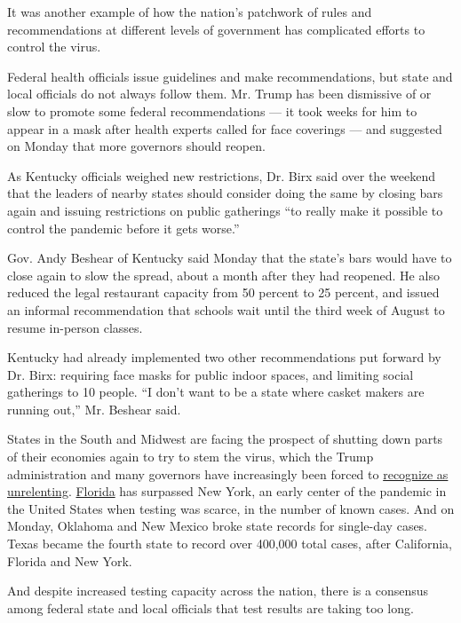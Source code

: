 It was another example of how the nation's patchwork of rules and
recommendations at different levels of government has complicated
efforts to control the virus.

Federal health officials issue guidelines and make recommendations, but
state and local officials do not always follow them. Mr. Trump has been
dismissive of or slow to promote some federal recommendations --- it
took weeks for him to appear in a mask after health experts called for
face coverings --- and suggested on Monday that more governors should
reopen.

As Kentucky officials weighed new restrictions, Dr. Birx said over the
weekend that the leaders of nearby states should consider doing the same
by closing bars again and issuing restrictions on public gatherings ``to
really make it possible to control the pandemic before it gets worse.''

Gov. Andy Beshear of Kentucky said Monday that the state's bars would
have to close again to slow the spread, about a month after they had
reopened. He also reduced the legal restaurant capacity from 50 percent
to 25 percent, and issued an informal recommendation that schools wait
until the third week of August to resume in-person classes.

Kentucky had already implemented two other recommendations put forward
by Dr. Birx: requiring face masks for public indoor spaces, and limiting
social gatherings to 10 people. ``I don't want to be a state where
casket makers are running out,'' Mr. Beshear said.

States in the South and Midwest are facing the prospect of shutting down
parts of their economies again to try to stem the virus, which the Trump
administration and many governors have increasingly been forced to
\href{https://www.nytimes.com/2020/07/21/us/politics/trump-coronavirus-masks.html}{recognize
as unrelenting}.
\href{https://www.nytimes.com/2020/07/26/world/coronavirus-live-updates.html\#link-44261c05}{Florida}
has surpassed New York, an early center of the pandemic in the United
States when testing was scarce, in the number of known cases. And on
Monday, Oklahoma and New Mexico broke state records for single-day
cases. Texas became the fourth state to record over 400,000 total cases,
after California, Florida and New York.

And despite increased testing capacity across the nation, there is a
consensus among federal state and local officials that test results are
taking too long.

